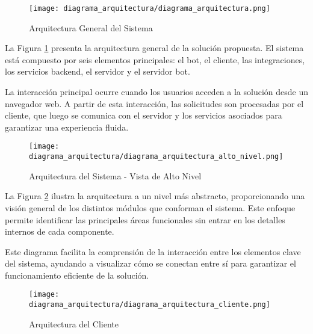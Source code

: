 
\begin{figure}[H]
    \centering
    \texttt{[image: diagrama\_arquitectura/diagrama\_arquitectura.png]}
    \caption{Arquitectura General del Sistema}
    \label{fig:diagrama_arquitectura}
\end{figure}

La Figura \ref{fig:diagrama_arquitectura} presenta la arquitectura general de la
solución propuesta. El sistema está compuesto por seis elementos principales: el
bot, el cliente, las integraciones, los servicios backend, el servidor y el
servidor bot. 

La interacción principal ocurre cuando los usuarios acceden a la solución
desde un navegador web. A partir de esta interacción, las solicitudes son
procesadas por el cliente, que luego se comunica con el servidor y los servicios
asociados para garantizar una experiencia fluida.

\begin{figure}[H]
    \centering
    \texttt{[image: diagrama\_arquitectura/diagrama\_arquitectura\_alto\_nivel.png]}
    \caption{Arquitectura del Sistema - Vista de Alto Nivel}
    \label{fig:diagrama_arquitectura_alto_nivel}
\end{figure}

La Figura \ref{fig:diagrama_arquitectura_alto_nivel} ilustra la arquitectura a
un nivel más abstracto, proporcionando una visión general de los distintos
módulos que conforman el sistema. Este enfoque permite identificar las
principales áreas funcionales sin entrar en los detalles internos de cada
componente. 

Este diagrama facilita la comprensión de la interacción entre los elementos
clave del sistema, ayudando a visualizar cómo se conectan entre sí para
garantizar el funcionamiento eficiente de la solución.

\begin{figure}[H]
    \centering
    \texttt{[image: diagrama\_arquitectura/diagrama\_arquitectura\_cliente.png]}
    \caption{Arquitectura del Cliente}
    \label{fig:diagrama_arquitectura_cliente}
\end{figure}

